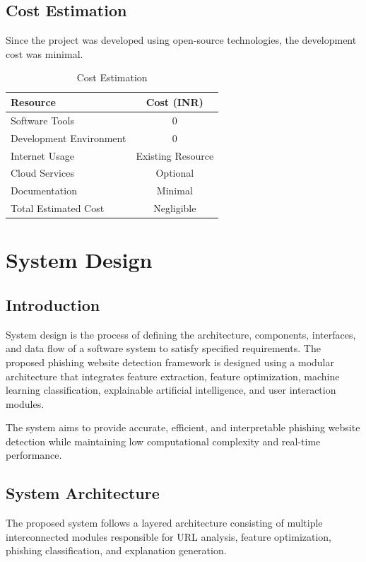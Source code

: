 \documentclass[12pt]{report}
\begin{document}
\section{Cost Estimation}

Since the project was developed using open-source technologies, the development cost was minimal.

\begin{table}[H]
\centering
\caption{Cost Estimation}
\begin{tabular}{|l|c|}
\hline
\textbf{Resource} & \textbf{Cost (INR)} \\
\hline
Software Tools & 0 \\
\hline
Development Environment & 0 \\
\hline
Internet Usage & Existing Resource \\
\hline
Cloud Services & Optional \\
\hline
Documentation & Minimal \\
\hline
Total Estimated Cost & Negligible \\
\hline
\end{tabular}
\end{table}

\chapter{System Design}

\section{Introduction}

System design is the process of defining the architecture, components, interfaces, and data flow of a software system to satisfy specified requirements. The proposed phishing website detection framework is designed using a modular architecture that integrates feature extraction, feature optimization, machine learning classification, explainable artificial intelligence, and user interaction modules.

The system aims to provide accurate, efficient, and interpretable phishing website detection while maintaining low computational complexity and real-time performance.

\section{System Architecture}

The proposed system follows a layered architecture consisting of multiple interconnected modules responsible for URL analysis, feature optimization, phishing classification, and explanation generation.
\end{document}
